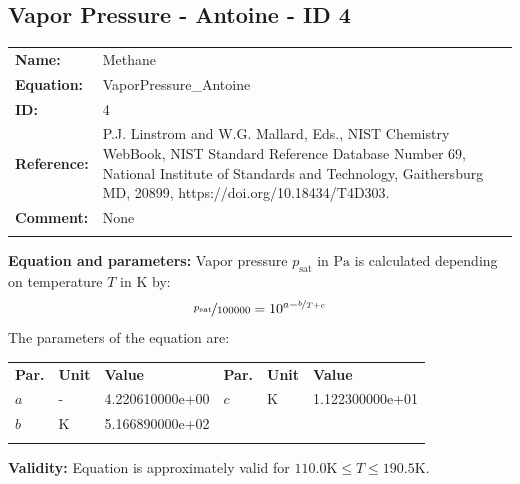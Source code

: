 \FloatBarrier
\newpage
\subsection{Vapor Pressure - Antoine - ID 4}
%
\begin{tabular}[l]{|lp{11.5cm}|}
\hline
\addlinespace

\textbf{Name:} & Methane \\
\textbf{Equation:} & VaporPressure\_Antoine \\
\textbf{ID:} & 4 \\
\textbf{Reference:} & P.J. Linstrom and W.G. Mallard, Eds., NIST Chemistry WebBook, NIST Standard Reference Database Number 69, National Institute of Standards and Technology, Gaithersburg MD, 20899, https://doi.org/10.18434/T4D303. \\
\textbf{Comment:} & None \\

\addlinespace
\hline
\end{tabular}
\newline

\textbf{Equation and parameters:}
\newline
%
Vapor pressure $p_\mathrm{sat}$ in $\si{\pascal}$ is calculated depending on temperature $T$ in $\si{\kelvin}$ by:
%
\begin{equation*}
\nicefrac{p_\mathrm{sat}}{100000} = 10^{a - \nicefrac{b}{T + c}}
\end{equation*}
%
The parameters of the equation are:
%
\begin{longtable}[l]{lll|lll}
\toprule
\addlinespace
\textbf{Par.} & \textbf{Unit} & \textbf{Value} &	\textbf{Par.} & \textbf{Unit} & \textbf{Value} \\
\addlinespace
\midrule
\endhead

\bottomrule
\endfoot
\bottomrule
\endlastfoot
\addlinespace

$a$ & - & 4.220610000e+00 & $c$ & $\si{\kelvin}$  & 1.122300000e+01 \\
$b$ & $\si{\kelvin}$ & 5.166890000e+02 & & & \\

\addlinespace\end{longtable}

\textbf{Validity:}
\newline
Equation is approximately valid for $110.0 \si{\kelvin} \leq T \leq 190.5 \si{\kelvin}$.
\newline

